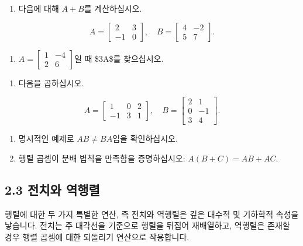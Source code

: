 \documentclass[
  12pt,
  a4paper,
]{article}
\begin{document}
\begin{enumerate}
\def\labelenumi{\arabic{enumi}.}
\item
  다음에 대해 \(A+B\)를 계산하십시오.
\end{enumerate}

\[A = \begin{bmatrix} 2 & 3 \\
-1 & 0 \end{bmatrix}, \quad
B = \begin{bmatrix} 4 & -2 \\
5 & 7 \end{bmatrix}.\]

\begin{enumerate}
\def\labelenumi{\arabic{enumi}.}
\item
  \(A = \begin{bmatrix} 1 & -4 \\ 2 & 6 \end{bmatrix}\)일 때 \$3A\$를 찾으십시오.
\end{enumerate}

\begin{enumerate}
\def\labelenumi{\arabic{enumi}.}
\item
  다음을 곱하십시오.
\end{enumerate}

\[A = \begin{bmatrix} 1 & 0 & 2 \\
-1 & 3 & 1 \end{bmatrix}, \quad
B = \begin{bmatrix} 2 & 1 \\
0 & -1 \\
3 & 4 \end{bmatrix}.\]

\begin{enumerate}
\def\labelenumi{\arabic{enumi}.}
\item
  명시적인 예제로 \(AB \neq BA\)임을 확인하십시오.
\item
  행렬 곱셈이 분배 법칙을 만족함을 증명하십시오: \(A(B+C) = AB + AC\).
\end{enumerate}

\subsection{2.3 전치와 역행렬}\label{23-transpose-and-inverse}

행렬에 대한 두 가지 특별한 연산, 즉 전치와 역행렬은 깊은 대수적 및 기하학적 속성을 낳습니다. 전치는 주 대각선을 기준으로 행렬을 뒤집어 재배열하고, 역행렬은 존재할 경우 행렬 곱셈에 대한 되돌리기 연산으로 작용합니다.
\end{document}
